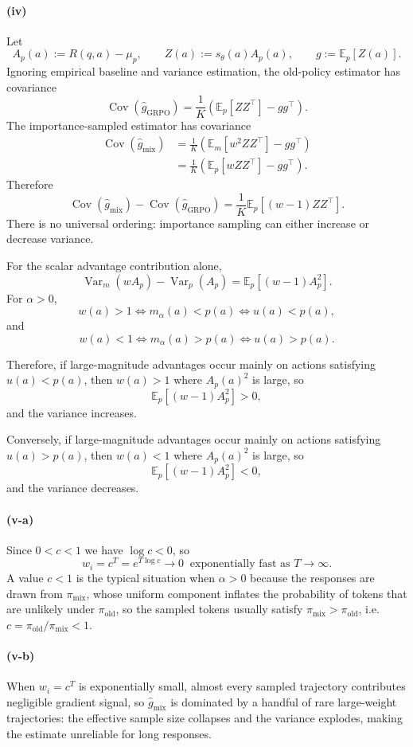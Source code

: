 \documentclass[11pt]{article}
\newcommand{\E}{\mathbb{E}}
\newcommand{\Var}{\operatorname{Var}}
\newcommand{\Cov}{\operatorname{Cov}}
\begin{document}
\paragraph{(iv)}
Let
\[
    A_p(a):=R(q,a)-\mu_p,
    \qquad
    Z(a):=s_\theta(a)A_p(a),
    \qquad
    g:=\E_p[Z(a)].
\]
Ignoring empirical baseline and variance estimation, the old-policy estimator has covariance
\[
    \Cov(\widehat g_{\mathrm{GRPO}})
    =
    \frac1K\left(\E_p[ZZ^\top]-gg^\top\right).
\]
The importance-sampled estimator has covariance
\[
\begin{aligned}
    \Cov(\widehat g_{\mathrm{mix}})
    &=
    \frac1K\left(\E_m[w^2ZZ^\top]-gg^\top\right) \\
    &=
    \frac1K\left(\E_p[wZZ^\top]-gg^\top\right).
\end{aligned}
\]
Therefore
\[
    \Cov(\widehat g_{\mathrm{mix}})
    -
    \Cov(\widehat g_{\mathrm{GRPO}})
    =
    \frac1K\E_p[(w-1)ZZ^\top].
\]
There is no universal ordering: importance sampling can either increase or decrease variance.

For the scalar advantage contribution alone,
\[
    \Var_m(wA_p)-\Var_p(A_p)
    =
    \E_p[(w-1)A_p^2].
\]
For $\alpha>0$,
\[
    w(a)>1
    \iff
    m_\alpha(a)<p(a)
    \iff
    u(a)<p(a),
\]
and
\[
    w(a)<1
    \iff
    m_\alpha(a)>p(a)
    \iff
    u(a)>p(a).
\]

Therefore, if large-magnitude advantages occur mainly on actions satisfying $u(a)<p(a)$, then $w(a)>1$ where $A_p(a)^2$ is large, so
\[
    \E_p[(w-1)A_p^2]>0,
\]
and the variance increases.

Conversely, if large-magnitude advantages occur mainly on actions satisfying $u(a)>p(a)$, then $w(a)<1$ where $A_p(a)^2$ is large, so
\[
    \E_p[(w-1)A_p^2]<0,
\]
and the variance decreases.

\paragraph{(v-a)}
Since $0<c<1$ we have $\log c<0$, so
\[
    \,w_i=c^T=e^{T\log c}\longrightarrow 0\ \text{ exponentially fast as }T\to\infty.\,
\]
A value $c<1$ is the typical situation when $\alpha>0$ because the responses are drawn from $\pi_{\mathrm{mix}}$, whose uniform component inflates the probability of tokens that are unlikely under $\pi_{\mathrm{old}}$, so the sampled tokens usually satisfy $\pi_{\mathrm{mix}}>\pi_{\mathrm{old}}$, i.e.\ $c=\pi_{\mathrm{old}}/\pi_{\mathrm{mix}}<1$.

\paragraph{(v-b)}
When $w_i=c^T$ is exponentially small, almost every sampled trajectory contributes negligible gradient signal, so $\widehat g_{\mathrm{mix}}$ is dominated by a handful of rare large-weight trajectories: the effective sample size collapses and the variance explodes, making the estimate unreliable for long responses.
\end{document}
